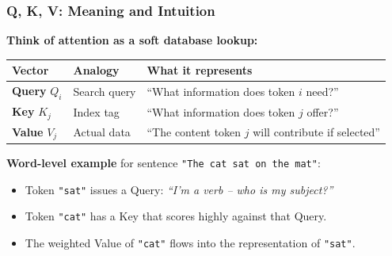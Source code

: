 \begin{frame}[fragile]\frametitle{Q, K, V: Meaning and Intuition}
\textbf{Think of attention as a soft database lookup:}
\begin{center}
\small
\renewcommand{\arraystretch}{1.3}
\begin{tabular}{|l|l|p{5.5cm}|}
\hline
\textbf{Vector} & \textbf{Analogy} & \textbf{What it represents} \\
\hline
\textbf{Query} $Q_i$ & Search query & ``What information does token $i$ need?'' \\
\hline
\textbf{Key}   $K_j$ & Index tag    & ``What information does token $j$ offer?'' \\
\hline
\textbf{Value} $V_j$ & Actual data  & ``The content token $j$ will contribute if selected'' \\
\hline
\end{tabular}
\end{center}
\vspace{0.3em}
\textbf{Word-level example} for sentence \texttt{"The cat sat on the mat"}:
\begin{itemize}
\item Token \texttt{"sat"} issues a Query: \textit{``I'm a verb – who is my subject?''}
\item Token \texttt{"cat"} has a Key that scores highly against that Query.
\item The weighted Value of \texttt{"cat"} flows into the representation of \texttt{"sat"}.
\end{itemize}
\end{frame}

